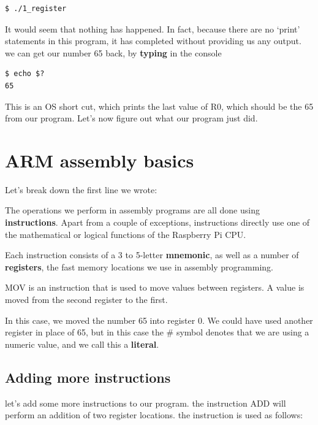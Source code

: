 \documentclass[a4paper, twocolumn, twoside, 11pt]{article}
\begin{document}
				\begin{lstlisting}[firstnumber=3]
$ ./1_register
				\end{lstlisting}
				
				It would seem that nothing has happened. In fact, because there are no `print' statements in this program, it has completed without providing us any output. we can get our number 65 back, by \textbf{typing} in the console 
				
				\begin{lstlisting}[firstnumber=4]
$ echo $?
65
				\end{lstlisting}
				
				This is an OS short cut, which prints the last value of R0, which should be the 65 from our program. Let's now figure out what our program just did.
				
	\section{ARM assembly basics}
	
		Let's break down the first line we wrote:
		
		
		
		The operations we perform in assembly programs are all done using \textbf{instructions}. Apart from a couple of exceptions, instructions directly use one of the mathematical or logical functions of the Raspberry Pi CPU.
		
		Each instruction consists of a 3 to 5-letter \textbf{mnemonic}, as well as a number of \textbf{registers}, the fast memory locations we use in assembly programming.
		
		MOV is an instruction that is used to move values between registers. A value is moved from the second register to the first.
		
		In this case, we moved the number 65 into register 0. We could have used another register in place of 65, but in this case the \# symbol denotes that we are using a numeric value, and we call this a \textbf{literal}.
		
		\subsection*{Adding more instructions}
		
			let's add some more instructions to our program. the instruction ADD will perform an addition of two register locations. the instruction is used as follows:
		
\end{document}
